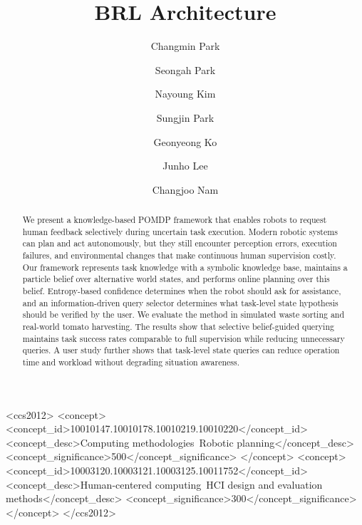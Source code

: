 \documentclass[manuscript,screen,review]{acmart}
\begin{document}
\title{BRL Architecture}

\author{Changmin Park}

\author{Seongah Park}

\author{Nayoung Kim}

\author{Sungjin Park}

\author{Geonyeong Ko}

\author{Junho Lee}

\author{Changjoo Nam}

\begin{abstract}
We present a knowledge-based POMDP framework that enables robots to request human feedback selectively during uncertain task execution. Modern robotic systems can plan and act autonomously, but they still encounter perception errors, execution failures, and environmental changes that make continuous human supervision costly. Our framework represents task knowledge with a symbolic knowledge base, maintains a particle belief over alternative world states, and performs online planning over this belief. Entropy-based confidence determines when the robot should ask for assistance, and an information-driven query selector determines what task-level state hypothesis should be verified by the user. We evaluate the method in simulated waste sorting and real-world tomato harvesting. The results show that selective belief-guided querying maintains task success rates comparable to full supervision while reducing unnecessary queries. A user study further shows that task-level state queries can reduce operation time and workload without degrading situation awareness.
\end{abstract}

\begin{CCSXML}
<ccs2012>
 <concept>
  <concept_id>10010147.10010178.10010219.10010220</concept_id>
  <concept_desc>Computing methodologies~Robotic planning</concept_desc>
  <concept_significance>500</concept_significance>
 </concept>
 <concept>
  <concept_id>10003120.10003121.10003125.10011752</concept_id>
  <concept_desc>Human-centered computing~HCI design and evaluation methods</concept_desc>
  <concept_significance>300</concept_significance>
 </concept>
</ccs2012>
\end{CCSXML}
\end{document}
